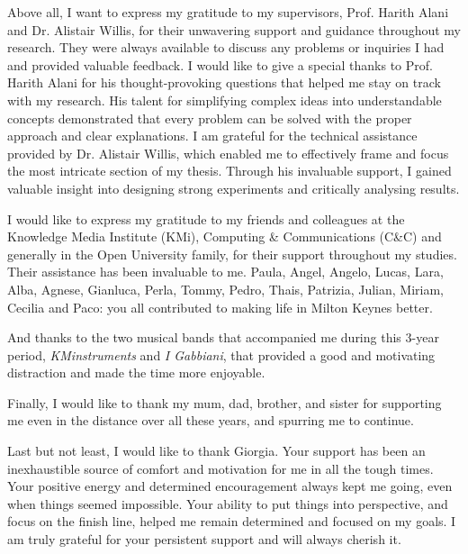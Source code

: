 Above all, I want to express my gratitude to my supervisors, Prof. Harith Alani and Dr. Alistair Willis, for their unwavering support and guidance throughout my research. They were always available to discuss any problems or inquiries I had and provided valuable feedback.
I would like to give a special thanks to Prof. Harith Alani for his thought-provoking questions that helped me stay on track with my research. His talent for simplifying complex ideas into understandable concepts demonstrated that every problem can be solved with the proper approach and clear explanations.
I am grateful for the technical assistance provided by Dr. Alistair Willis, which enabled me to effectively frame and focus the most intricate section of my thesis. Through his invaluable support, I gained valuable insight into designing strong experiments and critically analysing results.


I would like to express my gratitude to my friends and colleagues at the Knowledge Media Institute (KMi), Computing \& Communications (C\&C) and generally in the Open University family, for their support throughout my studies. Their assistance has been invaluable to me. Paula, Angel, Angelo, Lucas, Lara, Alba, Agnese, Gianluca, Perla, Tommy, Pedro, Thais, Patrizia, Julian, Miriam, Cecilia and Paco: you all contributed to making life in Milton Keynes better.

And thanks to the two musical bands that accompanied me during this 3-year period, \emph{KMinstruments} and \emph{I Gabbiani}, that provided a good and motivating distraction and made the time more enjoyable.

Finally, I would like to thank my mum, dad, brother, and sister for supporting me even in the distance over all these years, and spurring me to continue.%

Last but not least, I would like to thank Giorgia.
Your support has been an inexhaustible source of comfort and motivation for me in all the tough times. Your positive energy and determined encouragement always kept me going, even when things seemed impossible. Your ability to put things into perspective, and focus on the finish line, helped me remain determined and focused on my goals. I am truly grateful for your persistent support and will always cherish it.

